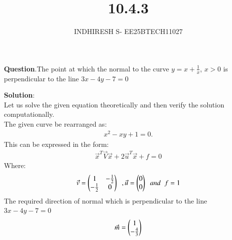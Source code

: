 \documentclass[journal]{IEEEtran}
\theoremstyle{remark}
\begin{document}

\onecolumn

\title{10.4.3}
\author{INDHIRESH S- EE25BTECH11027}
\maketitle


\renewcommand{\thefigure}{\theenumi}
\renewcommand{\thetable}{\theenumi}

\textbf{Question}.The point at which the normal to the curve
$y = x +\frac{1}{x}$, $x > 0$ is perpendicular to the line $3x - 4y - 7 = 0$

\textbf{Solution}:\\
Let us solve the given equation theoretically and then verify the solution computationally. \\
The given curve be rearranged as:
\begin{align}
x^2-xy+1=0.
\end{align}
This can be expressed in the form:
\begin{align}
\Vec{x}^T\Vec{V}\Vec{x}+2\Vec{u}^T\vec{x}+f=0
\end{align}
Where:
\begin{align}
\Vec{v}=\begin{pmatrix}1&-\frac{1}{2}\\-\frac{1}{2}&0\end{pmatrix}\;\;,\Vec{u}=\begin{pmatrix}0\\0\end{pmatrix}\;\;and\;\;f=1
\end{align}
The required direction of normal which is perpendicular to the line $3x-4y-7=0$
\begin{align}
\Vec{m}=\begin{pmatrix}1\\-\frac{4}{3}\end{pmatrix}
\end{align}
\end{document}
